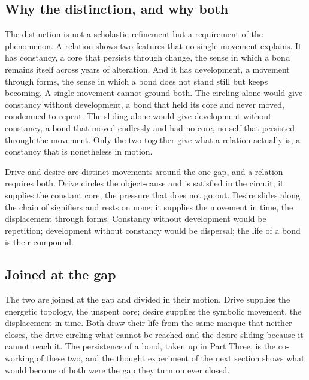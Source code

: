 \subsection*{Why the distinction, and why both}

The distinction is not a scholastic refinement but a requirement of the phenomenon. A relation shows two features that no single movement explains. It has constancy, a core that persists through change, the sense in which a bond remains itself across years of alteration. And it has development, a movement through forms, the sense in which a bond does not stand still but keeps becoming. A single movement cannot ground both. The circling alone would give constancy without development, a bond that held its core and never moved, condemned to repeat. The sliding alone would give development without constancy, a bond that moved endlessly and had no core, no self that persisted through the movement. Only the two together give what a relation actually is, a constancy that is nonetheless in motion.

\begin{claim}
Drive and desire are distinct movements around the one gap, and a relation requires both. Drive circles the object-cause and is satisfied in the circuit; it supplies the constant core, the pressure that does not go out. Desire slides along the chain of signifiers and rests on none; it supplies the movement in time, the displacement through forms. Constancy without development would be repetition; development without constancy would be dispersal; the life of a bond is their compound.
\end{claim}

\subsection*{Joined at the gap}

The two are joined at the gap and divided in their motion. Drive supplies the energetic topology, the unspent core; desire supplies the symbolic movement, the displacement in time. Both draw their life from the same manque that neither closes, the drive circling what cannot be reached and the desire sliding because it cannot reach it. The persistence of a bond, taken up in Part Three, is the co-working of these two, and the thought experiment of the next section shows what would become of both were the gap they turn on ever closed.
